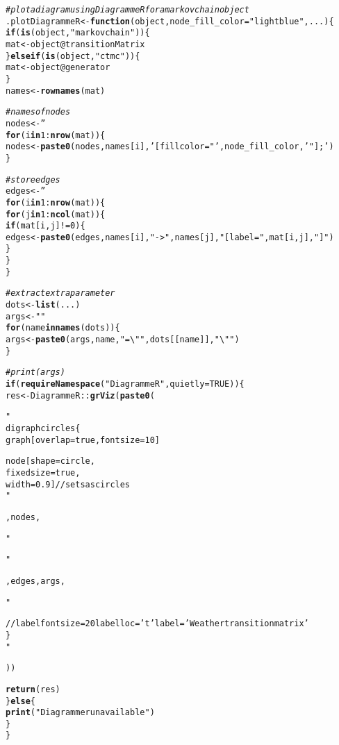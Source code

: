 \documentclass[11pt]{article}\usepackage[]{graphicx}\usepackage[table]{xcolor}
\makeatletter
\newcommand{\hlnum}[1]{\textcolor[rgb]{0.686,0.059,0.569}{#1}}%
\newcommand{\hlstr}[1]{\textcolor[rgb]{0.192,0.494,0.8}{#1}}%
\newcommand{\hlcom}[1]{\textcolor[rgb]{0.678,0.584,0.686}{\textit{#1}}}%
\newcommand{\hlopt}[1]{\textcolor[rgb]{0,0,0}{#1}}%
\newcommand{\hlstd}[1]{\textcolor[rgb]{0.345,0.345,0.345}{#1}}%
\newcommand{\hlkwa}[1]{\textcolor[rgb]{0.161,0.373,0.58}{\textbf{#1}}}%
\newcommand{\hlkwb}[1]{\textcolor[rgb]{0.69,0.353,0.396}{#1}}%
\newcommand{\hlkwc}[1]{\textcolor[rgb]{0.333,0.667,0.333}{#1}}%
\newcommand{\hlkwd}[1]{\textcolor[rgb]{0.737,0.353,0.396}{\textbf{#1}}}%
\newenvironment{kframe}{%
 \def\at@end@of@kframe{}%
 \ifinner\ifhmode%
  \def\at@end@of@kframe{\end{minipage}}%
  \begin{minipage}{\columnwidth}%
 \fi\fi%
 \def\FrameCommand##1{\hskip\@totalleftmargin \hskip-\fboxsep
 \colorbox{shadecolor}{##1}\hskip-\fboxsep
     \hskip-\linewidth \hskip-\@totalleftmargin \hskip\columnwidth}%
 \MakeFramed {\advance\hsize-\width
   \@totalleftmargin\z@ \linewidth\hsize
   \@setminipage}}%
 {\par\unskip\endMakeFramed%
 \at@end@of@kframe}
\newenvironment{knitrout}{}{} %
\makeatother
\begin{document}
\begin{knitrout}
\color{fgcolor}\begin{kframe}
\begin{alltt}
\hlcom{# plot a diagram using DiagrammeR for a markovchain object}
\hlstd{.plotDiagrammeR} \hlkwb{<-} \hlkwa{function}\hlstd{(}\hlkwc{object}\hlstd{,} \hlkwc{node_fill_color} \hlstd{=} \hlstr{"lightblue"}\hlstd{,} \hlkwc{...}\hlstd{) \{}
  \hlkwa{if}\hlstd{(}\hlkwd{is}\hlstd{(object,}\hlstr{"markovchain"}\hlstd{))\{}
    \hlstd{mat} \hlkwb{<-} \hlstd{object}\hlopt{@}\hlkwc{transitionMatrix}
  \hlstd{\}} \hlkwa{else if}\hlstd{(}\hlkwd{is}\hlstd{(object,}\hlstr{"ctmc"}\hlstd{))\{}
    \hlstd{mat} \hlkwb{<-} \hlstd{object}\hlopt{@}\hlkwc{generator}
  \hlstd{\}}
  \hlstd{names} \hlkwb{<-} \hlkwd{rownames}\hlstd{(mat)}

  \hlcom{# names of nodes}
  \hlstd{nodes} \hlkwb{<-} \hlstr{''}
  \hlkwa{for}\hlstd{(i} \hlkwa{in} \hlnum{1}\hlopt{:}\hlkwd{nrow}\hlstd{(mat)) \{}
    \hlstd{nodes} \hlkwb{<-} \hlkwd{paste0}\hlstd{(nodes, names[i],} \hlstr{' [fillcolor = "'}\hlstd{, node_fill_color,} \hlstr{'"]; '}\hlstd{)}
  \hlstd{\}}

  \hlcom{# store edges}
  \hlstd{edges} \hlkwb{<-} \hlstr{''}
  \hlkwa{for}\hlstd{(i} \hlkwa{in} \hlnum{1}\hlopt{:}\hlkwd{nrow}\hlstd{(mat)) \{}
    \hlkwa{for}\hlstd{(j} \hlkwa{in} \hlnum{1}\hlopt{:}\hlkwd{ncol}\hlstd{(mat)) \{}
      \hlkwa{if} \hlstd{(mat[i,j]} \hlopt{!=} \hlnum{0}\hlstd{) \{}
        \hlstd{edges} \hlkwb{<-} \hlkwd{paste0}\hlstd{(edges, names[i],} \hlstr{"->"}\hlstd{, names[j],} \hlstr{" [label = "}\hlstd{, mat[i,j],} \hlstr{"] "}\hlstd{)}
      \hlstd{\}}
    \hlstd{\}}
  \hlstd{\}}

  \hlcom{# extract extra parameter}
  \hlstd{dots} \hlkwb{<-} \hlkwd{list}\hlstd{(...)}
  \hlstd{args} \hlkwb{<-} \hlstr{""}
  \hlkwa{for}\hlstd{(name} \hlkwa{in} \hlkwd{names}\hlstd{(dots)) \{}
    \hlstd{args} \hlkwb{<-} \hlkwd{paste0}\hlstd{(args, name,} \hlstr{"=\textbackslash{}""}\hlstd{, dots[[name]],} \hlstr{"\textbackslash{}" "}\hlstd{)}
  \hlstd{\}}

  \hlcom{# print(args)}
  \hlkwa{if} \hlstd{(}\hlkwd{requireNamespace}\hlstd{(}\hlstr{"DiagrammeR"}\hlstd{,} \hlkwc{quietly} \hlstd{=} \hlnum{TRUE}\hlstd{)) \{}
    \hlstd{res} \hlkwb{<-} \hlstd{DiagrammeR}\hlopt{::}\hlkwd{grViz}\hlstd{(}\hlkwd{paste0}\hlstd{(}\hlstr{"
  digraph circles \{
            graph [overlap = true, fontsize = 10]

            node [shape = circle,
            fixedsize = true,
            width = 0.9] // sets as circles
            "}\hlstd{, nodes,} \hlstr{"
        
            "}\hlstd{, edges, args,}\hlstr{"

            // labelfontsize = 20 labelloc='t' label ='Weather transition matrix'
          \}
  "}\hlstd{))}

    \hlkwd{return} \hlstd{(res)}
  \hlstd{\}} \hlkwa{else} \hlstd{\{}
    \hlkwd{print}\hlstd{(}\hlstr{"Diagrammer unavailable"}\hlstd{)}
  \hlstd{\}}
\hlstd{\}}
\end{alltt}
\end{kframe}
\end{knitrout}
\end{document}

